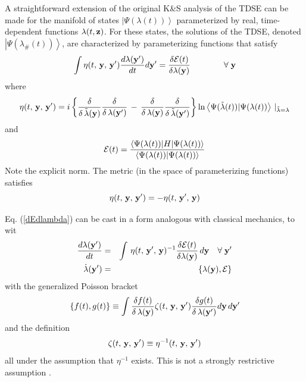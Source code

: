 A straightforward extension of the original K\&S analysis of the TDSE can be
made for the manifold of states $\left| \Psi (\lambda (t))\right\rangle $
parameterized by real, time-dependent functions $\lambda (t,{\bf z})$. For
these states, the solutions of the TDSE, denoted $\left| \Psi (\lambda
_{\#}(t))\right\rangle $, are characterized by parameterizing functions that
satisfy 
\begin{equation}
\int \eta (t,\,{\bf y},\,{\bf y}^{\prime })\frac{d\lambda ({\bf y}^{\prime })%
}{dt}d{\bf y}^{\prime }=\frac{\delta {\cal E}(t)}{\delta \lambda ({\bf y})}%
\qquad \qquad \forall \;{\bf y}  \label{dEdlambda}
\end{equation}%
where 
\begin{equation}
\eta (t,\,{\bf y},\,{\bf y}^{\prime })=i\left\{ \frac{\delta }{\delta \,%
\tilde{\lambda}({\bf y})}\frac{\delta }{\delta \,\lambda ({\bf y}^{\prime })}%
\,-\,\frac{\delta }{\delta \,\lambda ({\bf y})}\frac{\delta }{\delta \,%
\tilde{\lambda}({\bf y}^{\prime })}\right\} \ln \left\langle \Psi (\tilde{%
\lambda}(t))|\Psi (\lambda (t))\right\rangle \,|_{\tilde{\lambda}=\lambda }
\label{eta}
\end{equation}%
and 
\begin{equation}
{\cal E}(t)=\frac{\left\langle \Psi (\lambda (t))|H|\Psi (\lambda
(t))\right\rangle }{\left\langle \Psi (\lambda (t))|\Psi (\lambda
(t))\right\rangle }  \label{Eoft}
\end{equation}%
Note the explicit norm. The metric (in the space of parameterizing
functions) satisfies 
\begin{equation}
\eta (t,\,{\bf y},\,{\bf y}^{\prime })=-\eta (t,\,{\bf y}^{\prime },\,{\bf y}%
)
\end{equation}

Eq. (\ref{dEdlambda}) can be cast in a form analogous with classical
mechanics, to wit 
\begin{eqnarray}
\frac{d\lambda ({\bf y}^{\prime })}{dt} &=&\int \,\eta (t,\,{\bf y}^{\prime
},\,{\bf y})^{-1}\frac{\delta {\cal E}(t)}{\delta \lambda ({\bf y})}\,d{\bf y%
}\quad \forall \;{\bf y}^{\prime }  \nonumber \\
\dot{\lambda}({\bf y}^{\prime }) &=&\{\lambda ({\bf y}),{\cal E}\}
\label{genEOM}
\end{eqnarray}%
with the generalized Poisson bracket 
\begin{equation}
\{f(t),g(t)\}\equiv \int \frac{\delta f(t)}{\delta \,\lambda ({\bf y})}\zeta
(t,\,{\bf y},\,{\bf y}^{\prime })\frac{\delta g(t)}{\delta \,\lambda ({\bf y}%
^{\prime })}d{\bf y}\,d{\bf y}^{\prime }  \label{genPoisson}
\end{equation}%
and the definition 
\begin{equation}
\zeta (t,\,{\bf y},\,{\bf y}^{\prime })\equiv \eta ^{-1}(t,\,{\bf y},\,{\bf y%
}^{\prime })  \label{etainverse}
\end{equation}%
all under the assumption that $\eta ^{-1}$ exists. This is not a strongly
restrictive assumption \cite{etainv}.

